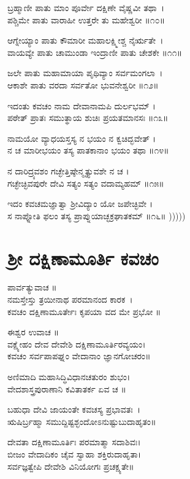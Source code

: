 ಬ್ರಹ್ಮಾಣೀ ಪಾತು ಮಾಂ ಪೂರ್ವೇ ದಕ್ಷಿಣೇ ವೈಷ್ಣವೀ ತಥಾ~।\\
ಪಶ್ಚಿಮೇ ಪಾತು ವಾರಾಹೀ ಉತ್ತರೇ ತು ಮಹೇಶ್ವರೀ ॥೧೦॥

ಆಗ್ನೇಯ್ಯಾಂ ಪಾತು ಕೌಮಾರೀ ಮಹಾಲಕ್ಷ್ಮೀಶ್ಚ ನೈರ್ಋತೇ~।\\
ವಾಯವ್ಯೇ ಪಾತು ಚಾಮುಂಡಾ ಇಂದ್ರಾಣೀ ಪಾತು ಚೇಶಕೇ ॥೧೧॥

ಜಲೇ ಪಾತು ಮಹಾಮಾಯಾ ಪೃಥಿವ್ಯಾಂ ಸರ್ವಮಂಗಲಾ~।\\
ಆಕಾಶೇ ಪಾತು ವರದಾ ಸರ್ವತೋ ಭುವನೇಶ್ವರೀ ॥೧೨॥

ಇದಂತು ಕವಚಂ ನಾಮ ದೇವಾನಾಮಪಿ ದುರ್ಲಭಮ್ ।\\
ಪಠೇತ್ ಪ್ರಾತಃ ಸಮುತ್ಥಾಯ ಶುಚಿಃ ಪ್ರಯತಮಾನಸಃ ॥೧೩॥

ನಾಮಯೋ ವ್ಯಾಧಯಸ್ತಸ್ಯ ನ ಭಯಂ ನ ಕ್ವಚಿದ್ಭವೇತ್ ।\\
ನ ಚ ಮಾರೀಭಯಂ ತಸ್ಯ ಪಾತಕಾನಾಂ ಭಯಂ ತಥಾ ॥೧೪॥

ನ ದಾರಿದ್ರ್ಯವಶಂ ಗಚ್ಛೇತ್ತಿಷ್ಠೇನ್ಮೃತ್ಯುವಶೇ ನ ಚ ।\\
ಗಚ್ಛೇಚ್ಛಿವಪುರೇ ದೇವಿ ಸತ್ಯಂ ಸತ್ಯಂ ವದಾಮ್ಯಹಮ್ ॥೧೫॥

ಇದಂ ಕವಚಮಜ್ಞಾತ್ವಾ ಶ್ರೀವಿದ್ಯಾಂ ಯೋ ಜಪೇಚ್ಛಿವೇ ।\\
ಸ ನಾಪ್ನೋತಿ ಫಲಂ ತಸ್ಯ ಪ್ರಾಪ್ನುಯಾಚ್ಛಕ್ರಘಾತಕಮ್ ॥೧೬॥
)))))

\section{ಶ್ರೀ ದಕ್ಷಿಣಾಮೂರ್ತಿ ಕವಚಂ}
ಪಾರ್ವತ್ಯುವಾಚ ॥\\
ನಮಸ್ತೇಸ್ತು ತ್ರಯೀನಾಥ ಪರಮಾನಂದ ಕಾರಕ~।\\
ಕವಚಂ ದಕ್ಷಿಣಾಮೂರ್ತೇಃ ಕೃಪಯಾ ವದ ಮೇ ಪ್ರಭೋ ॥

ಈಶ್ವರ ಉವಾಚ ॥\\
ವಕ್ಷ್ಯೇಹಂ ದೇವ ದೇವೇಶಿ ದಕ್ಷಿಣಾಮೂರ್ತಿರವ್ಯಯಂ।\\
ಕವಚಂ ಸರ್ವಪಾಪಘ್ನಂ ವೇದಾನಾಂ ಜ್ಞಾನಗೋಚರಂ॥

ಅಣಿಮಾದಿ ಮಹಾಸಿದ್ಧಿವಿಧಾನಚತುರಂ ಶುಭಂ।\\
ವೇದಶಾಸ್ತ್ರಪುರಾಣಾನಿ ಕವಿತಾತರ್ಕ ಏವ ಚ ॥

ಬಹುಧಾ ದೇವಿ ಜಾಯಂತೇ ಕವಚಸ್ಯ ಪ್ರಭಾವತಃ~।\\
ಋಷಿರ್ಬ್ರಹ್ಮಾ ಸಮುದ್ದಿಷ್ಟಶ್ಛಂದೋಽನುಷ್ಟುಬುದಾಹೃತಂ॥

ದೇವತಾ ದಕ್ಷಿಣಾಮೂರ್ತಿಃ ಪರಮಾತ್ಮಾ ಸದಾಶಿವಃ।\\
ಬೀಜಂ ವೇದಾದಿಕಂ ಚೈವ ಸ್ವಾಹಾ ಶಕ್ತಿರುದಾಹೃತಾ।\\
ಸರ್ವಜ್ಞತ್ವೇಪಿ ದೇವೇಶಿ ವಿನಿಯೋಗಃ ಪ್ರಚಕ್ಷ್ಯತೇ॥


